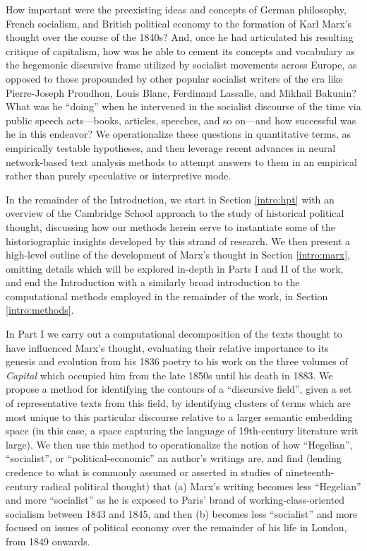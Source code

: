 How important were the preexisting ideas and concepts of German philosophy, French socialism, and British political economy to the formation of Karl Marx's thought over the course of the 1840s? And, once he had articulated his resulting critique of capitalism, how  was he able to cement its concepts and vocabulary as the hegemonic discursive frame utilized by socialist movements across Europe, as opposed to those propounded by other popular socialist writers of the era like Pierre-Joseph Proudhon, Louis Blanc, Ferdinand Lassalle, and Mikhail Bakunin? What was he ``doing'' when he intervened in the socialist discourse of the time via public speech acts---books, articles, speeches, and so on---and how successful was he in this endeavor? We operationalize these questions in quantitative terms, as empirically testable hypotheses, and then leverage recent advances in neural network-based text analysis methods to attempt answers to them in an empirical rather than purely speculative or interpretive mode.

In the remainder of the Introduction, we start in Section \ref{intro:hpt} with an overview of the Cambridge School approach to the study of historical political thought, discussing how our methods herein serve to instantiate some of the historiographic insights developed by this strand of research. We then present a high-level outline of the development of Marx's thought in Section \ref{intro:marx}, omitting details which will be explored in-depth in Parts I and II of the work, and end the Introduction with a similarly broad introduction to the computational methods employed in the remainder of the work, in Section \ref{intro:methods}. 

In Part I we carry out a computational decomposition of the texts thought to have influenced Marx's thought, evaluating their relative importance to its genesis and evolution from his 1836 poetry to his work on the three volumes of \textit{Capital} which occupied him from the late 1850s until his death in 1883. We propose a method for identifying the contours of a ``discursive field'', given a set of representative texts from this field, by identifying clusters of terms which are most unique to this particular discourse relative to a larger semantic embedding space (in this case, a space capturing the language of 19th-century literature writ large). We then use this method to operationalize the notion of how ``Hegelian'', ``socialist'', or ``political-economic'' an author's writings are, and find (lending credence to what is commonly assumed or asserted in studies of nineteenth-century radical political thought) that (a) Marx's writing becomes less ``Hegelian'' and more ``socialist'' as he is exposed to Paris' brand of working-class-oriented socialism between 1843 and 1845, and then (b) becomes less ``socialist'' and more focused on issues of political economy over the remainder of his life in London, from 1849 onwards.

